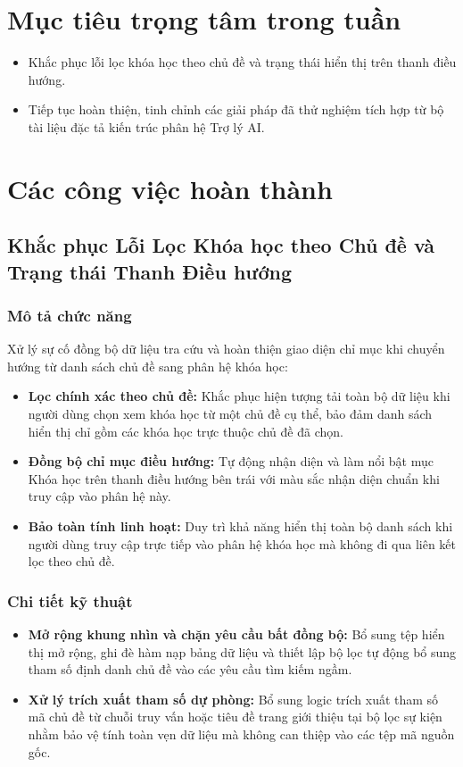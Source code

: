 \section{Mục tiêu trọng tâm trong tuần}
\begin{itemize}
    \item Khắc phục lỗi lọc khóa học theo chủ đề và trạng thái hiển thị trên thanh điều hướng.
    \item Tiếp tục hoàn thiện, tinh chỉnh các giải pháp đã thử nghiệm tích hợp từ bộ tài liệu đặc tả kiến trúc phân hệ Trợ lý AI.
\end{itemize}

\section{Các công việc hoàn thành}

\subsection{Khắc phục Lỗi Lọc Khóa học theo Chủ đề và Trạng thái Thanh Điều hướng}

\subsubsection{Mô tả chức năng}
Xử lý sự cố đồng bộ dữ liệu tra cứu và hoàn thiện giao diện chỉ mục khi chuyển hướng từ danh sách chủ đề sang phân hệ khóa học:
\begin{itemize}
    \item \textbf{Lọc chính xác theo chủ đề:} Khắc phục hiện tượng tải toàn bộ dữ liệu khi người dùng chọn xem khóa học từ một chủ đề cụ thể, bảo đảm danh sách hiển thị chỉ gồm các khóa học trực thuộc chủ đề đã chọn.
    \item \textbf{Đồng bộ chỉ mục điều hướng:} Tự động nhận diện và làm nổi bật mục Khóa học trên thanh điều hướng bên trái với màu sắc nhận diện chuẩn khi truy cập vào phân hệ này.
    \item \textbf{Bảo toàn tính linh hoạt:} Duy trì khả năng hiển thị toàn bộ danh sách khi người dùng truy cập trực tiếp vào phân hệ khóa học mà không đi qua liên kết lọc theo chủ đề.
\end{itemize}

\subsubsection{Chi tiết kỹ thuật}
\begin{itemize}
    \item \textbf{Mở rộng khung nhìn và chặn yêu cầu bất đồng bộ:} Bổ sung tệp hiển thị mở rộng, ghi đè hàm nạp bảng dữ liệu và thiết lập bộ lọc tự động bổ sung tham số định danh chủ đề vào các yêu cầu tìm kiếm ngầm.
    \item \textbf{Xử lý trích xuất tham số dự phòng:} Bổ sung logic trích xuất tham số mã chủ đề từ chuỗi truy vấn hoặc tiêu đề trang giới thiệu tại bộ lọc sự kiện nhằm bảo vệ tính toàn vẹn dữ liệu mà không can thiệp vào các tệp mã nguồn gốc.
\end{itemize}

